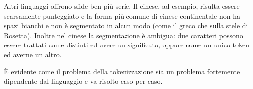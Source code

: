 Altri linguaggi offrono sfide ben pi\`u serie. Il cinese, ad esempio, risulta
essere scarsamente punteggiato e la forma pi\`u comune di cinese continentale
non ha spazi bianchi e non \`e segmentato in alcun modo (come il greco che sulla
stele di Rosetta). Inoltre nel cinese la segmentazione \`e ambigua: due caratteri
possono essere trattati come distinti ed avere un significato, oppure come un unico
token ed averne un altro.

\`E evidente come il problema della tokenizzazione sia un problema fortemente
dipendente dal linguaggio e va risolto caso per caso.
